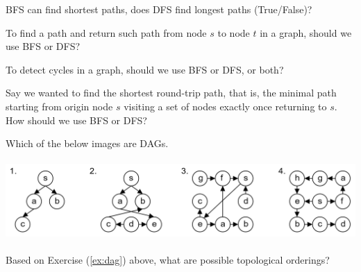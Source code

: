 \vspace{.5em}
\begin{Exercise} BFS can find shortest paths, does DFS find longest paths (True/False)?
\end{Exercise}

\vspace{.5em}
\begin{Exercise} To find a path and return such path from node $s$ to node $t$ in a graph, should we use 
    BFS or DFS?
\end{Exercise}

\vspace{.5em}
\begin{Exercise} To detect cycles in a graph, should we use BFS or DFS, or both?
\end{Exercise}

\vspace{.5em}
\begin{Exercise} Say we wanted to find the shortest round-trip path, that is, the minimal path starting from origin node $s$ visiting a set of
    nodes exactly once returning to $s$. How should we use BFS or DFS?
\end{Exercise}

\vspace{.5em}
\begin{Exercise} Which of the below images are DAGs.

    \label{ex:dag}
    \vspace{1em}
    \hspace{-2em}
    \includegraphics[height=1.2in]{./Sections/graphs/dag/dag_example.png}
\end{Exercise}

\vspace{.5em}
\begin{Exercise} Based on Exercise (\ref{ex:dag}) above, what are possible topological orderings?
\end{Exercise}

\newpage 

